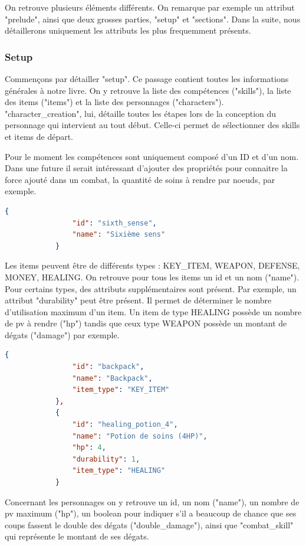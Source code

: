 		On retrouve plusieurs éléments différents. On remarque par exemple un attribut "prelude", ainsi que deux grosses parties, "setup" et "sections". Dans la suite, nous détaillerons uniquement les attributs les plus frequemment présents.

		\subsubsection{Setup}

			Commençons par détailler "setup". Ce passage contient toutes les informations générales à notre livre. On y retrouve la liste des compétences ("skills"), la liste des items ("items") et la liste des personnages ("characters"). "character\_creation", lui, détaille toutes les étapes lors de la conception du personnage qui intervient au tout début. Celle-ci permet de sélectionner des skills et items de départ.

			Pour le moment les compétences sont uniquement composé d'un ID et d'un nom. Dans une future \maj{} il serait intéressant d'ajouter des propriétés pour connaitre la force ajouté dans un combat, la quantité de soins à rendre par noeuds, par exemple.

			\begin{lstlisting}[gobble=12, language=json, caption=Exemple de compétence]
			{
				"id": "sixth_sense",
				"name": "Sixième sens"
			}
			\end{lstlisting}

			Les items peuvent être de différents types : KEY\_ITEM, WEAPON, DEFENSE, MONEY, HEALING. On retrouve pour tous les items un id et un nom ("name"). Pour certains types, des attributs supplémentaires sont présent. Par exemple, un attribut "durability" peut être présent. Il permet de déterminer le nombre d'utilisation maximum d'un item. Un item de type HEALING possède un nombre de pv à rendre ("hp") tandis que ceux type WEAPON possède un montant de dégats ("damage") par exemple.

			\begin{lstlisting}[gobble=12, language=json, caption=Exemple d'items]
			{
				"id": "backpack",
				"name": "Backpack",
				"item_type": "KEY_ITEM"
			},
			{
				"id": "healing_potion_4",
				"name": "Potion de soins (4HP)",
				"hp": 4,
				"durability": 1,
				"item_type": "HEALING"
			}
			\end{lstlisting}

			Concernant les personnages on y retrouve un id, un nom ("name"), un nombre de pv maximum ("hp"), un boolean pour indiquer s'il a beaucoup de chance que ses coups fassent le double des dégats ("double\_damage"), ainsi que "combat\_skill" qui représente le montant de ses dégats.

